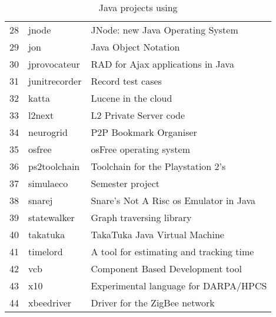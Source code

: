 \begin{table}[ht]
\begin{tabular}{|r|l|l|}
  28 & jnode & JNode: new Java Operating System \\ 
  29 & jon & Java Object Notation \\ 
  30 & jprovocateur & RAD for Ajax applications in Java \\ 
  31 & junitrecorder & Record test cases \\ 
  32 & katta & Lucene in the cloud \\ 
  33 & l2next & L2 Private Server code  \\ 
  34 & neurogrid & P2P Bookmark Organiser \\ 
  35 & osfree & osFree operating system \\ 
  36 & ps2toolchain & Toolchain for the Playstation 2's \\ 
  37 & simulaeco & Semester project \\ 
  38 & snarej & Snare's Not A Risc os Emulator in Java \\ 
  39 & statewalker & Graph traversing library \\ 
  40 & takatuka & TakaTuka Java Virtual Machine \\ 
  41 & timelord & A tool for estimating and tracking time \\ 
  42 & vcb & Component Based Development tool \\ 
  43 & x10 & Experimental language for DARPA/HPCS \\ 
  44 & xbeedriver & Driver for the ZigBee network \\ 
\hline
\end{tabular}
\caption{Java projects using \smu{}}  \label{table:projects}
\end{table}

